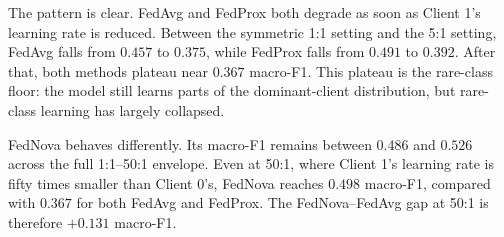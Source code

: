 \documentclass[11pt,a4paper]{report}
\begin{document}
\begin{table}[H]
\centering
\caption{Learning-rate-asymmetry envelope at L4, $n=3$ matched seeds per cell.
Client~0 (dominant) holds $\textrm{lr} = 0.01$ throughout; Client~1
(rare-class holder) takes the smaller rate that sets each ratio. Columns are
test macro-F1 for the three optimisers and the FedNova advantage over FedAvg
and FedProx. FedNova (bold) leads at every ratio and stays flat across the
envelope, while FedAvg and FedProx plateau at the rare-class floor by 5:1.}
\label{tab:lr-envelope}
\end{table}

The pattern is clear. FedAvg and FedProx both degrade as soon as Client 1's
learning rate is reduced. Between the symmetric 1:1 setting and the 5:1
setting, FedAvg falls from $0.457$ to $0.375$, while FedProx falls from
$0.491$ to $0.392$. After that, both methods plateau near $0.367$ macro-F1.
This plateau is the rare-class floor: the model still learns parts of the
dominant-client distribution, but rare-class learning has largely collapsed.

FedNova behaves differently. Its macro-F1 remains between $0.486$ and
$0.526$ across the full 1:1--50:1 envelope. Even at 50:1, where Client 1's
learning rate is fifty times smaller than Client 0's, FedNova reaches
$0.498$ macro-F1, compared with $0.367$ for both FedAvg and FedProx. The
FedNova--FedAvg gap at 50:1 is therefore $+0.131$ macro-F1.
\end{document}
